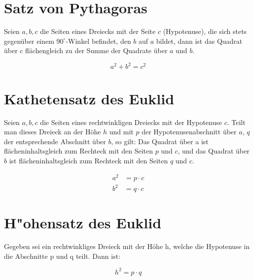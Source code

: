 \documentclass{article}
\begin{document}
\section{Satz von Pythagoras}

\begin{figure}[h]
\centering
{}
\end{figure}

Seien $a, b, c$ die Seiten eines Dreiecks mit der Seite $c$ (Hypotenuse), die sich stets gegenüber einem $90^\circ$-Winkel befindet, den $b$ auf $a$ bildet, dann ist das Quadrat über $c$ flächengleich zu der Summe der Quadrate über $a$ und $b$.

\begin{equation}
a^2 + b^2 = c^2
\end{equation}

\section{Kathetensatz des Euklid}

Seien $a, b, c$ die Seiten eines rechtwinkligen Dreiecks mit der Hypotenuse $c$. Teilt man dieses Dreieck an der Höhe $h$ und mit $p$ der Hypotenusenabschnitt über $a$, $q$ der entsprechende Abschnitt über $b$, so gilt:
Das Quadrat über a ist flächeninhaltsgleich zum Rechteck mit den Seiten $p$ und $c$, und das Quadrat über $b$ ist flächeninhaltsgleich zum Rechteck mit den Seiten $q$ und $c$.

\begin{align}
a^2 &= p\cdot c\\
b^2 &= q\cdot c
\end{align}

\section{H"ohensatz des Euklid}

Gegeben sei ein rechtwinkliges Dreieck mit der Höhe h, welche die Hypotenuse in die Abschnitte p und q teilt. Dann ist:

\begin{equation}
h^2 = p\cdot q
\end{equation}
\end{document}
